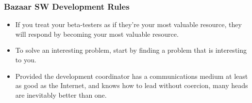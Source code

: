 \documentclass[hyperref={pdfpagelabels=false},xcolor=pst,pdf,fragile]{beamer}
\begin{document}
\begin{frame}
  \frametitle{Bazaar SW Development Rules}

  \begin{itemize}
	\item If you treat your beta-testers as if they're your most valuable
	  resource, they will respond by becoming your most valuable resource.

	  \pause
	\item To solve an interesting problem, start by finding a problem that
	  is interesting to you.

	  \pause
	\item Provided the development coordinator has a communications medium
	  at least as good as the Internet, and knows how to lead without
	  coercion, many heads are inevitably better than one.

  \end{itemize}

%
%
%
%
%
%
%
%
%
%

\end{frame}
\end{document}
